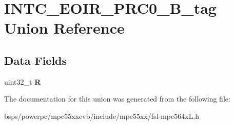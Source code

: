 \hypertarget{unionINTC__EOIR__PRC0__32B__tag}{}\section{I\+N\+T\+C\+\_\+\+E\+O\+I\+R\+\_\+\+P\+R\+C0\+\_\+B\+\_\+tag Union Reference}
\label{unionINTC__EOIR__PRC0__32B__tag}
\subsection*{Data Fields}
\begin{DoxyCompactItemize}
\item 
\mbox{\label{unionINTC__EOIR__PRC0__32B__tag_ac30fc91643211cdad6937ab92141e9b2}} 
uint32\+\_\+t {\bfseries R}
\end{DoxyCompactItemize}


The documentation for this union was generated from the following file\+:\begin{DoxyCompactItemize}
\item 
bsps/powerpc/mpc55xxevb/include/mpc55xx/fsl-\/mpc564x\+L.\+h\end{DoxyCompactItemize}
